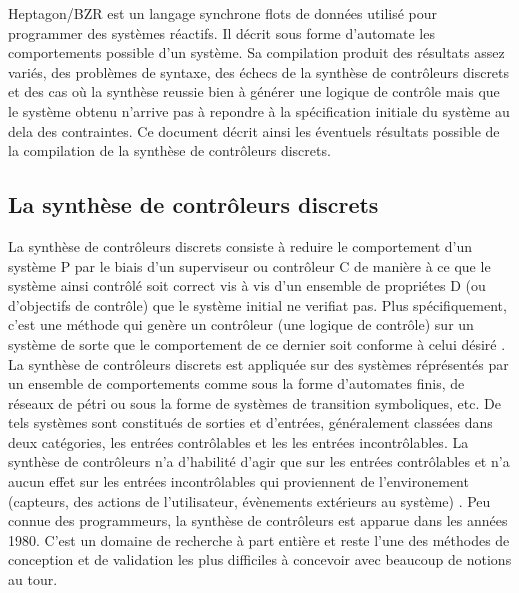 \documentclass{svjour3}
\begin{document}
Heptagon/BZR est un langage synchrone flots de données utilisé pour programmer des systèmes réactifs. Il décrit sous forme d'automate les comportements
possible d'un système. Sa compilation produit des résultats assez variés, des problèmes de syntaxe, des échecs de la synthèse de contrôleurs discrets
et des cas où la synthèse reussie bien à générer une logique de contrôle mais que le système obtenu n'arrive pas à repondre à la spécification initiale du système 
au dela des contraintes. Ce document décrit ainsi les éventuels résultats possible de la compilation de la synthèse de contrôleurs discrets.

\subsection{La synthèse de contrôleurs discrets}
La synthèse de contrôleurs discrets consiste à reduire le comportement d'un système P par le biais d'un superviseur ou contrôleur C de manière 
à ce que le système ainsi contrôlé soit correct vis à vis d'un ensemble de propriétes D (ou d'objectifs de contrôle) que le système initial ne verifiat pas. 
Plus spécifiquement, c'est une méthode qui genère un contrôleur (une logique de contrôle) sur un système de sorte que le comportement de ce dernier 
soit conforme à celui désiré \cite{ref8}. La synthèse de contrôleurs discrets est appliquée sur des systèmes réprésentés par un ensemble de comportements 
comme sous la forme d'automates finis, de réseaux de pétri ou sous la forme de systèmes de transition symboliques, etc. De tels systèmes sont constitués de sorties
et d'entrées, généralement classées dans deux catégories, les entrées contrôlables et les les entrées incontrôlables. La synthèse de contrôleurs n'a d'habilité 
d'agir que sur les entrées contrôlables et n'a aucun effet sur les entrées incontrôlables qui proviennent de l'environement (capteurs, des actions de l'utilisateur, 
évènements extérieurs au système) \cite{drm13}.  Peu connue des programmeurs, la synthèse de contrôleurs est apparue dans les ann\'ees 1980. C'est un domaine
de recherche à part entière et reste l'une des m\'ethodes de conception et de validation les plus difficiles à concevoir avec beaucoup de notions au tour.
\end{document}
